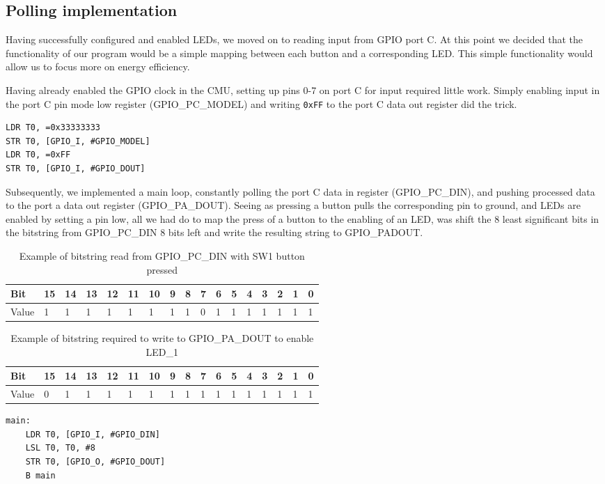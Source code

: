\subsection{Polling implementation}
\label{sec:polling-implementation}

Having successfully configured and enabled LEDs, we moved on to reading input from GPIO port C. At this point we decided that the functionality of our program would be a simple mapping between each button and a corresponding LED. This simple functionality would allow us to focus more on energy efficiency.

\vspace{1cm}

Having already enabled the GPIO clock in the CMU, setting up pins 0-7 on port C for input required little work. Simply enabling input in the port C pin mode low register (GPIO\_PC\_MODEL) and writing \texttt{0xFF} to the port C data out register did the trick.

\begin{lstlisting}[label=enable-gpio-input, caption=Enabling input on port C]
LDR T0, =0x33333333
STR T0, [GPIO_I, #GPIO_MODEL]
LDR T0, =0xFF
STR T0, [GPIO_I, #GPIO_DOUT]
\end{lstlisting}

Subsequently, we implemented a main loop, constantly polling the port C data in register (GPIO\_PC\_DIN), and pushing processed data to the port a data out register (GPIO\_PA\_DOUT). Seeing as pressing a button pulls the corresponding pin to ground, and LEDs are enabled by setting a pin low, all we had do to map the press of a button to the enabling of an LED, was shift the 8 least significant bits in the bitstring from GPIO\_PC\_DIN 8 bits left and write the resulting string to GPIO\_PADOUT. 

\begin{table}[!h]
    \begin{tabular}{l|l|l|l|l|l|l|l|l|l|l|l|l|l|l|l|l}
    Bit   & 15 & 14 & 13 & 12 & 11 & 10 & 9 & 8 & 7 & 6 & 5 & 4 & 3 & 2 & 1 & 0 \\ \hline
    Value & 1  & 1  & 1  & 1  & 1  & 1  & 1 & 1 & 0 & 1 & 1 & 1 & 1 & 1 & 1 & 1 \\
    \end{tabular}
    \caption{Example of bitstring read from GPIO\_PC\_DIN with SW1 button pressed}
\end{table}

\begin{table}[!h]
    \begin{tabular}{l|l|l|l|l|l|l|l|l|l|l|l|l|l|l|l|l}
    Bit   & 15 & 14 & 13 & 12 & 11 & 10 & 9 & 8 & 7 & 6 & 5 & 4 & 3 & 2 & 1 & 0 \\ \hline
    Value & 0  & 1  & 1  & 1  & 1  & 1  & 1 & 1 & 1 & 1 & 1 & 1 & 1 & 1 & 1 & 1 \\
    \end{tabular}
    \caption{Example of bitstring required to write to GPIO\_PA\_DOUT to enable LED\_1}
\end{table}


\newpage

\begin{lstlisting}[label=main-polling-loop, caption=Main loop]
main:
    LDR T0, [GPIO_I, #GPIO_DIN]
    LSL T0, T0, #8
    STR T0, [GPIO_O, #GPIO_DOUT]
    B main
\end{lstlisting}
